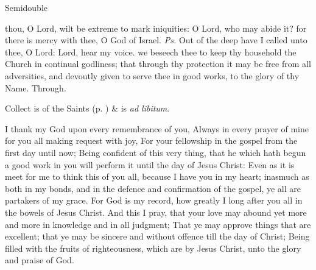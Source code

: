 \begin{inhead}
{Semidouble}
\end{inhead}
\par\noindent
{}



\properantiphonfix

\introit
{} thou, O Lord, wilt be extreme to mark iniquities: O Lord, who may abide it? for there is mercy with thee, O God of Israel. \textit{Ps.} Out of the deep have I called unto thee, O Lord: Lord, hear my voice.
\collect
{} we beseech thee to keep thy household the Church in continual godliness; that through thy protection it may be free from all adversities, and devoutly given to serve thee in good works, to the glory of thy Name. Through.
\begin{rubric}
     Collect is of the Saints (p. \pageref{SPSaints}) \&  is \emph{ad libitum}.
\end{rubric}

 I thank my God upon every remembrance of you, Always in every prayer of mine for you all making request with joy, For your fellowship in the gospel from the first day until now; Being confident of this very thing, that he which hath begun a good work in you will perform it until the day of Jesus Christ: Even as it is meet for me to think this of you all, because I have you in my heart; inasmuch as both in my bonds, and in the defence and confirmation of the gospel, ye all are partakers of my grace. For God is my record, how greatly I long after you all in the bowels of Jesus Christ. And this I pray, that your love may abound yet more and more in knowledge and in all judgment; That ye may approve things that are excellent; that ye may be sincere and without offence till the day of Christ; Being filled with the fruits of righteousness, which are by Jesus Christ, unto the glory and praise of God.

